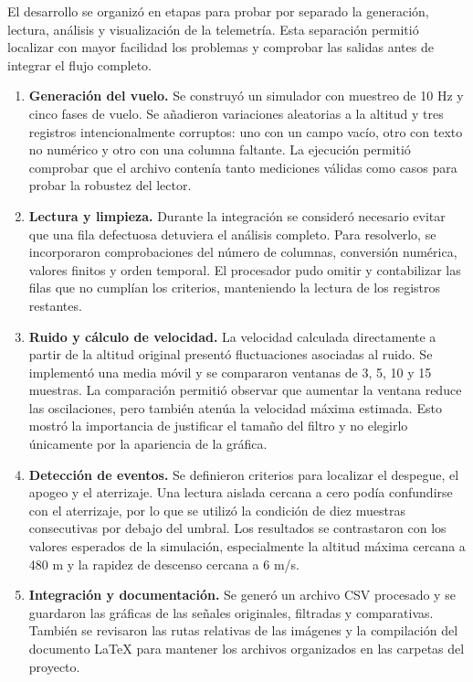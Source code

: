 \documentclass[9pt,a4paper]{extarticle}
\begin{document}
El desarrollo se organizó en etapas para probar por separado la generación, lectura, análisis y visualización de la telemetría. Esta separación permitió localizar con mayor facilidad los problemas y comprobar las salidas antes de integrar el flujo completo.

\begin{enumerate}[leftmargin=*,label=\textbf{Etapa \arabic*.}]
\item \textbf{Generación del vuelo.} Se construyó un simulador con muestreo de 10 Hz y cinco fases de vuelo. Se añadieron variaciones aleatorias a la altitud y tres registros intencionalmente corruptos: uno con un campo vacío, otro con texto no numérico y otro con una columna faltante. La ejecución permitió comprobar que el archivo contenía tanto mediciones válidas como casos para probar la robustez del lector.

\item \textbf{Lectura y limpieza.} Durante la integración se consideró necesario evitar que una fila defectuosa detuviera el análisis completo. Para resolverlo, se incorporaron comprobaciones del número de columnas, conversión numérica, valores finitos y orden temporal. El procesador pudo omitir y contabilizar las filas que no cumplían los criterios, manteniendo la lectura de los registros restantes.

\item \textbf{Ruido y cálculo de velocidad.} La velocidad calculada directamente a partir de la altitud original presentó fluctuaciones asociadas al ruido. Se implementó una media móvil y se compararon ventanas de 3, 5, 10 y 15 muestras. La comparación permitió observar que aumentar la ventana reduce las oscilaciones, pero también atenúa la velocidad máxima estimada. Esto mostró la importancia de justificar el tamaño del filtro y no elegirlo únicamente por la apariencia de la gráfica.

\item \textbf{Detección de eventos.} Se definieron criterios para localizar el despegue, el apogeo y el aterrizaje. Una lectura aislada cercana a cero podía confundirse con el aterrizaje, por lo que se utilizó la condición de diez muestras consecutivas por debajo del umbral. Los resultados se contrastaron con los valores esperados de la simulación, especialmente la altitud máxima cercana a 480 m y la rapidez de descenso cercana a 6 m/s.

\item \textbf{Integración y documentación.} Se generó un archivo CSV procesado y se guardaron las gráficas de las señales originales, filtradas y comparativas. También se revisaron las rutas relativas de las imágenes y la compilación del documento LaTeX para mantener los archivos organizados en las carpetas del proyecto.
\end{enumerate}
\end{document}
